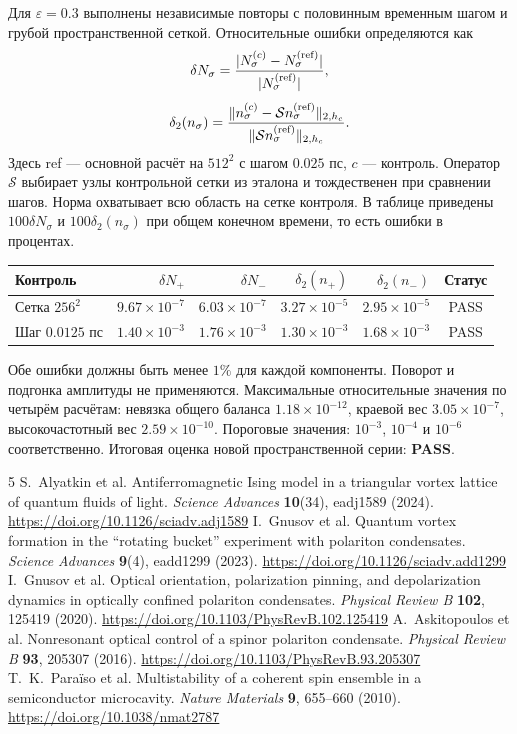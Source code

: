 \documentclass[12pt,a4paper]{article}
\begin{document}
Для $\varepsilon=0.3$ выполнены независимые повторы с половинным временным шагом и грубой пространственной сеткой. Относительные ошибки определяются как
\[\begin{gathered}\delta N_\sigma=\frac{|N_\sigma^{(c)}-N_\sigma^{(\rm ref)}|}{|N_\sigma^{(\rm ref)}|},\\[0.4em]\delta_2(n_\sigma)=\frac{\|n_\sigma^{(c)}-\mathcal S n_\sigma^{(\rm ref)}\|_{2,h_c}}{\|\mathcal S n_\sigma^{(\rm ref)}\|_{2,h_c}}.\end{gathered}\]
Здесь ref --- основной расчёт на $512^2$ с шагом $0.025$ пс, $c$ --- контроль. Оператор $\mathcal S$ выбирает узлы контрольной сетки из эталона и тождественен при сравнении шагов. Норма охватывает всю область на сетке контроля. В таблице приведены $100\delta N_\sigma$ и $100\delta_2(n_\sigma)$ при общем конечном времени, то есть ошибки в процентах.
\begin{center}\small\begin{tabular}{@{}lrrrrc@{}}\toprule
Контроль & $\delta N_+$ & $\delta N_-$ & $\delta_2(n_+)$ & $\delta_2(n_-)$ & Статус\\\midrule
Сетка $256^2$ & $9.67\times10^{-7}$ & $6.03\times10^{-7}$ & $3.27\times10^{-5}$ & $2.95\times10^{-5}$ & PASS\\
Шаг $0.0125$ пс & $1.40\times10^{-3}$ & $1.76\times10^{-3}$ & $1.30\times10^{-3}$ & $1.68\times10^{-3}$ & PASS\\
\bottomrule\end{tabular}\end{center}
Обе ошибки должны быть менее $1\%$ для каждой компоненты. Поворот и подгонка амплитуды не применяются.
Максимальные относительные значения по четырём расчётам: невязка общего баланса $1.18\times10^{-12}$, краевой вес $3.05\times10^{-7}$, высокочастотный вес $2.59\times10^{-10}$. Пороговые значения: $10^{-3}$, $10^{-4}$ и $10^{-6}$ соответственно.
Итоговая оценка новой пространственной серии: \textbf{PASS}.


\clearpage
\begin{thebibliography}{5}
S.~Alyatkin et al.
Antiferromagnetic Ising model in a triangular vortex lattice of quantum fluids of light.
\textit{Science Advances} \textbf{10}(34), eadj1589 (2024).
\url{https://doi.org/10.1126/sciadv.adj1589}
I.~Gnusov et al.
Quantum vortex formation in the ``rotating bucket'' experiment with polariton condensates.
\textit{Science Advances} \textbf{9}(4), eadd1299 (2023).
\url{https://doi.org/10.1126/sciadv.add1299}
I.~Gnusov et al.
Optical orientation, polarization pinning, and depolarization dynamics in optically confined polariton condensates.
\textit{Physical Review B} \textbf{102}, 125419 (2020).
\url{https://doi.org/10.1103/PhysRevB.102.125419}
A.~Askitopoulos et al.
Nonresonant optical control of a spinor polariton condensate.
\textit{Physical Review B} \textbf{93}, 205307 (2016).
\url{https://doi.org/10.1103/PhysRevB.93.205307}
T.~K.~Para\"iso et al.
Multistability of a coherent spin ensemble in a semiconductor microcavity.
\textit{Nature Materials} \textbf{9}, 655--660 (2010).
\url{https://doi.org/10.1038/nmat2787}
\end{thebibliography}
\end{document}
